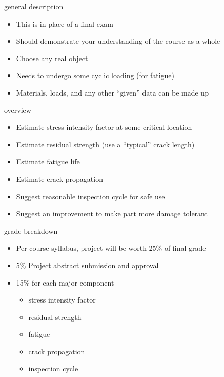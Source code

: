 \documentclass[
  letterpaper,
  ignorenonframetext,
  aspectratio=43,
  handout,
  12pt]{beamer}
\providecommand{\tightlist}{%
  \setlength{\itemsep}{0pt}\setlength{\parskip}{0pt}}
\providecommand{\tightlist}{%
\setlength{\itemsep}{0pt}\setlength{\parskip}{0pt}}
\begin{document}
\begin{frame}{general description}
\protect\hypertarget{general-description}{}
\begin{itemize}
\tightlist
\item
  This is in place of a final exam
\item
  Should demonstrate your understanding of the course as a whole
\item
  Choose any real object
\item
  Needs to undergo some cyclic loading (for fatigue)
\item
  Materials, loads, and any other ``given'' data can be made up
\end{itemize}
\end{frame}

\begin{frame}{overview}
\protect\hypertarget{overview}{}
\begin{itemize}
\tightlist
\item
  Estimate stress intensity factor at some critical location
\item
  Estimate residual strength (use a ``typical'' crack length)
\item
  Estimate fatigue life
\item
  Estimate crack propagation
\item
  Suggest reasonable inspection cycle for safe use
\item
  Suggest an improvement to make part more damage tolerant
\end{itemize}
\end{frame}

\begin{frame}{grade breakdown}
\protect\hypertarget{grade-breakdown}{}
\begin{itemize}
\tightlist
\item
  Per course syllabus, project will be worth 25\% of final grade
\item
  5\% Project abstract submission and approval
\item
  15\% for each major component

  \begin{itemize}
  \tightlist
  \item
    stress intensity factor
  \item
    residual strength
  \item
    fatigue
  \item
    crack propagation
  \item
    inspection cycle
  \end{itemize}
\end{itemize}
\end{frame}
\end{document}
